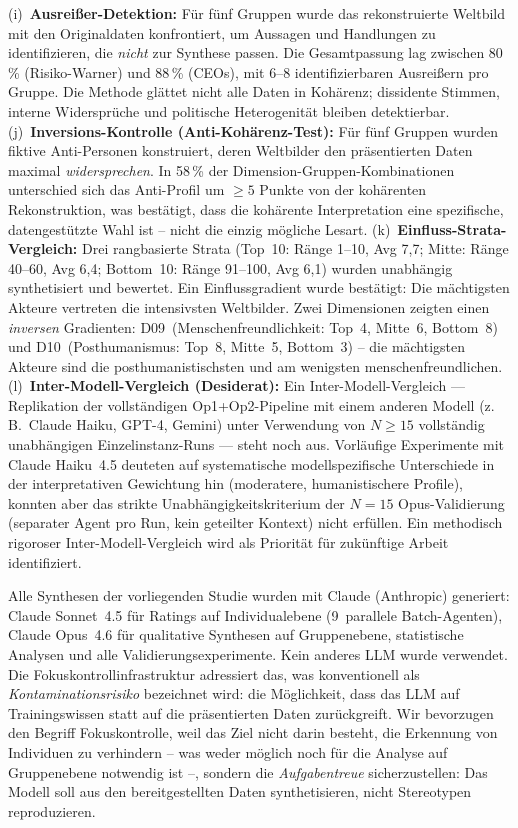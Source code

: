 \documentclass[12pt,a4paper]{article}
\begin{document}
(i)~\textbf{Ausrei\ss{}er-Detektion:} F\"ur f\"unf Gruppen wurde das rekonstruierte Weltbild mit den Originaldaten konfrontiert, um Aussagen und Handlungen zu identifizieren, die \emph{nicht} zur Synthese passen. Die Gesamtpassung lag zwischen 80\,\% (Risiko-Warner) und 88\,\% (CEOs), mit 6--8 identifizierbaren Ausrei\ss{}ern pro Gruppe. Die Methode gl\"attet nicht alle Daten in Koh\"arenz; dissidente Stimmen, interne Widerspr\"uche und politische Heterogenit\"at bleiben detektierbar.
(j)~\textbf{Inversions-Kontrolle (Anti-Koh\"arenz-Test):} F\"ur f\"unf Gruppen wurden fiktive Anti-Personen konstruiert, deren Weltbilder den pr\"asentierten Daten maximal \emph{widersprechen}. In 58\,\% der Dimension-Gruppen-Kombinationen unterschied sich das Anti-Profil um $\geq 5$ Punkte von der koh\"arenten Rekonstruktion, was best\"atigt, dass die koh\"arente Interpretation eine spezifische, datengest\"utzte Wahl ist -- nicht die einzig m\"ogliche Lesart.
(k)~\textbf{Einfluss-Strata-Vergleich:} Drei rangbasierte Strata (Top~10: R\"ange 1--10, Avg 7,7; Mitte: R\"ange 40--60, Avg 6,4; Bottom~10: R\"ange 91--100, Avg 6,1) wurden unabh\"angig synthetisiert und bewertet. Ein Einflussgradient wurde best\"atigt: Die m\"achtigsten Akteure vertreten die intensivsten Weltbilder. Zwei Dimensionen zeigten einen \emph{inversen} Gradienten: D09~(Menschenfreundlichkeit: Top~4, Mitte~6, Bottom~8) und D10~(Posthumanismus: Top~8, Mitte~5, Bottom~3) -- die m\"achtigsten Akteure sind die posthumanistischsten und am wenigsten menschenfreundlichen.
(l)~\textbf{Inter-Modell-Vergleich (Desiderat):} Ein Inter-Modell-Vergleich --- Replikation der vollst\"andigen Op1+Op2-Pipeline mit einem anderen Modell (z.\,B.\ Claude Haiku, GPT-4, Gemini) unter Verwendung von $N \geq 15$ vollst\"andig unabh\"angigen Einzelinstanz-Runs --- steht noch aus. Vorl\"aufige Experimente mit Claude Haiku~4.5 deuteten auf systematische modellspezifische Unterschiede in der interpretativen Gewichtung hin (moderatere, humanistischere Profile), konnten aber das strikte Unabh\"angigkeitskriterium der $N = 15$ Opus-Validierung (separater Agent pro Run, kein geteilter Kontext) nicht erf\"ullen. Ein methodisch rigoroser Inter-Modell-Vergleich wird als Priorit\"at f\"ur zuk\"unftige Arbeit identifiziert.

Alle Synthesen der vorliegenden Studie wurden mit Claude (Anthropic) generiert: Claude Sonnet~4.5 f\"ur Ratings auf Individualebene (9~parallele Batch-Agenten), Claude Opus~4.6 f\"ur qualitative Synthesen auf Gruppenebene, statistische Analysen und alle Validierungsexperimente. Kein anderes LLM wurde verwendet. Die Fokuskontrollinfrastruktur adressiert das, was konventionell als \emph{Kontaminationsrisiko} bezeichnet wird: die M\"oglichkeit, dass das LLM auf Trainingswissen statt auf die pr\"asentierten Daten zur\"uckgreift. Wir bevorzugen den Begriff \glqq Fokuskontrolle\grqq, weil das Ziel nicht darin besteht, die Erkennung von Individuen zu verhindern -- was weder m\"oglich noch f\"ur die Analyse auf Gruppenebene notwendig ist --, sondern die \emph{Aufgabentreue} sicherzustellen: Das Modell soll aus den bereitgestellten Daten synthetisieren, nicht Stereotypen reproduzieren.
\end{document}
